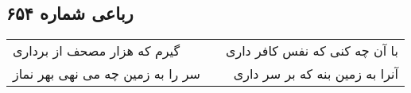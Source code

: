 \begin{center}
\section*{رباعی شماره ۶۵۴}
\label{sec:sh654}
\begin{longtable}{l p{0.5cm} r}
گیرم که هزار مصحف از برداری
&&
با آن چه کنی که نفس کافر داری
\\
سر را به زمین چه می نهی بهر نماز
&&
آنرا به زمین بنه که بر سر داری
\\
\end{longtable}
\end{center}
